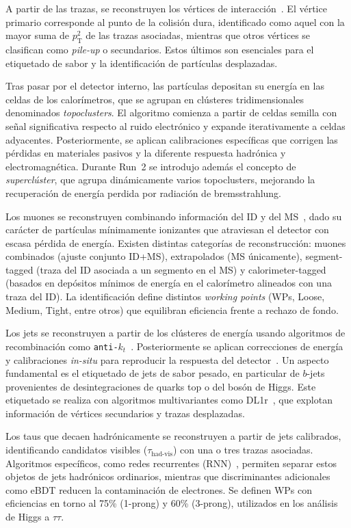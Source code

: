 A partir de las trazas, se reconstruyen los vértices de interacción~\cite{vertex_run1,vertex_run2,vertex_run3,vertex_run3_2}. El vértice primario corresponde al punto de la colisión dura, identificado como aquel con la mayor suma de $p_{\mathrm{T}}^{2}$ de las trazas asociadas, mientras que otros vértices se clasifican como \textit{pile-up} o secundarios. Estos últimos son esenciales para el etiquetado de sabor y la identificación de partículas desplazadas.

Tras pasar por el detector interno, las partículas depositan su energía en las celdas de los calorímetros, que se agrupan en clústeres tridimensionales denominados \textit{topoclusters}. El algoritmo comienza a partir de celdas semilla con señal significativa respecto al ruido electrónico y expande iterativamente a celdas adyacentes. Posteriormente, se aplican calibraciones específicas que corrigen las pérdidas en materiales pasivos y la diferente respuesta hadrónica y electromagnética. Durante Run~2 se introdujo además el concepto de \textit{superclúster}, que agrupa dinámicamente varios topoclusters, mejorando la recuperación de energía perdida por radiación de bremsstrahlung.

Los muones se reconstruyen combinando información del ID y del MS~\cite{muon_reco_run2}, dado su carácter de partículas mínimamente ionizantes que atraviesan el detector con escasa pérdida de energía. Existen distintas categorías de reconstrucción: muones combinados (ajuste conjunto ID+MS), extrapolados (MS únicamente), segment-tagged (traza del ID asociada a un segmento en el MS) y calorimeter-tagged (basados en depósitos mínimos de energía en el calorímetro alineados con una traza del ID). La identificación define distintos \textit{working points} (WPs, Loose, Medium, Tight, entre otros) que equilibran eficiencia frente a rechazo de fondo.

Los jets se reconstruyen a partir de los clústeres de energía usando algoritmos de recombinación como \texttt{anti-$k_{t}$}~\cite{Cacciari_2008}. Posteriormente se aplican correcciones de energía y calibraciones \textit{in-situ} para reproducir la respuesta del detector~\cite{jets_calib}. Un aspecto fundamental es el etiquetado de jets de sabor pesado, en particular de $b$-jets provenientes de desintegraciones de quarks top o del bosón de Higgs. Este etiquetado se realiza con algoritmos multivariantes como DL1r~\cite{tagging}, que explotan información de vértices secundarios y trazas desplazadas.

Los taus que decaen hadrónicamente se reconstruyen a partir de jets calibrados, identificando candidatos visibles ($\tau_{\text{had-vis}}$) con una o tres trazas asociadas. Algoritmos específicos, como redes recurrentes (RNN)~\cite{ATL-PHYS-PUB-2022-044}, permiten separar estos objetos de jets hadrónicos ordinarios, mientras que discriminantes adicionales como eBDT reducen la contaminación de electrones. Se definen WPs con eficiencias en torno al 75\% (1-prong) y 60\% (3-prong), utilizados en los análisis de Higgs a $\tau\tau$.

